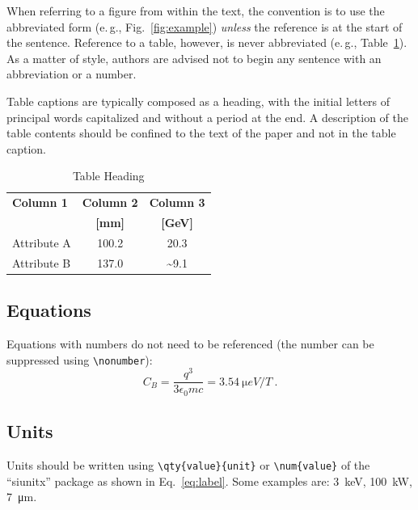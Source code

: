 \documentclass[%
               biblatex,     %
               ]{jacow}
\begin{document}
When referring to a figure from within the text, the
convention is to use the abbreviated form (e.\,g., Fig.~\ref{fig:example})
\emph{unless} the reference is at the start of the sentence. Reference to a
table, however, is never abbreviated (e.\,g., Table~\ref{tab:example}).
As a matter of style, authors are advised not to begin any sentence with an abbreviation or a number.

Table captions are typically composed as a heading, with the initial letters of principal words capitalized and without a period at the end. A description of the table contents should be confined to the text of the paper and not in the table caption. 
\begin{table}[!hbt]
   \centering
   \caption{Table Heading}
   \begin{tabular}{lcc}
       \toprule
       \textbf{Column 1} & \textbf{Column 2} & \textbf{Column 3} \\ 
                         & \textbf{[mm]}     & \textbf{[GeV]}	 \\
       \midrule
          Attribute A    & \num{100.2}       & \num{20.3}        \\
          Attribute B    & \num{137.0}       & \num{~9.1}        \\
       \bottomrule
   \end{tabular}
   \label{tab:example}
\end{table}

\subsection{Equations}



Equations with numbers do not need to be referenced (the number can be suppressed using \verb|\nonumber|):
\begin{equation}\label{eq:label}
    C_B=\frac{q^3}{3\epsilon_{0}mc} = \qty{3.54}{\micro eV/T}\ .
\end{equation}

\subsection{Units}

Units should be written using \verb|\qty{value}{unit}| or \verb|\num{value}| of the “siunitx” package as shown in Eq.~\eqref{eq:label}. Some examples are: \qty{3}{keV}, \qty{100}{kW}, \qty{7}{\um}.
\end{document}
